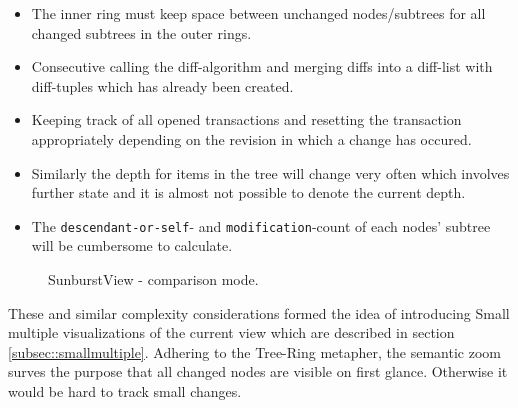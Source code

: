 \begin{itemize}
\item The inner ring must keep space between unchanged nodes/subtrees for all changed subtrees in the outer rings.
\item Consecutive calling the diff-algorithm and merging diffs into a diff-list with diff-tuples which has already been created.
\item Keeping track of all opened transactions and resetting the transaction appropriately depending on the revision in which a change has occured.
\item Similarly the depth for items in the tree will change very often which involves further state and it is almost not possible to denote the current depth.
\item The \texttt{descendant-or-self}- and \texttt{modification}-count of each nodes' subtree will be cumbersome to calculate.
\end{itemize}

\begin{figure}[tb]
\caption{\label{fig:sunburst} SunburstView - comparison mode.}
\end{figure}

These and similar complexity considerations formed the idea of introducing Small multiple visualizations of the current view which are described in section \ref{subsec::smallmultiple}.
Adhering to the Tree-Ring metapher, the semantic zoom surves the purpose that all changed nodes are visible on first glance. Otherwise it would be hard to track small changes. 

